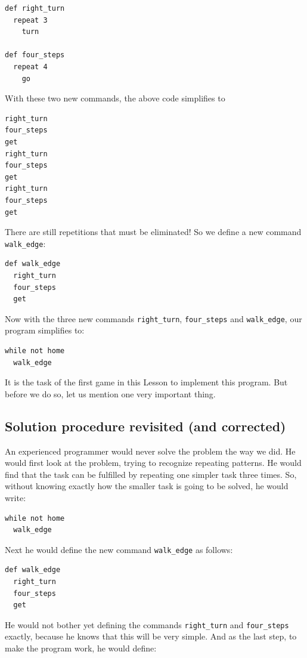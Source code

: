 \documentclass[article,A4,12pt]{llncs}
\begin{document}
{\small
\begin{verbatim}
def right_turn
  repeat 3
    turn

def four_steps
  repeat 4
    go
\end{verbatim}
}
\noindent
With these two new commands, the above code simplifies to 

{\small
\begin{verbatim}
right_turn
four_steps
get
right_turn
four_steps
get
right_turn
four_steps
get
\end{verbatim}
}
\noindent
There are still repetitions that must be eliminated! So we define a new command 
{\tt walk\_edge}:

{\small
\begin{verbatim}
def walk_edge
  right_turn
  four_steps
  get
\end{verbatim}
}
\noindent
Now with the three new commands {\tt right\_turn}, {\tt four\_steps} and
{\tt walk\_edge}, our program simplifies to:

{\small
\begin{verbatim}
while not home
  walk_edge
\end{verbatim}
}
\noindent
It is the task of the first game in this Lesson to implement this program. But before we 
do so, let us mention one very important thing.

\subsection{Solution procedure revisited (and corrected)}


An experienced programmer would never solve the problem the way we did.
He would first look at the problem, trying to recognize repeating patterns. 
He would find that the task can be fulfilled by repeating one simpler task 
three times. So, without knowing exactly how the smaller task is going to 
be solved, he would write:

{\small
\begin{verbatim}
while not home
  walk_edge
\end{verbatim}
}
\noindent
Next he would define the new command {\tt walk\_edge} as follows:

{\small
\begin{verbatim}
def walk_edge
  right_turn
  four_steps
  get
\end{verbatim}
}
\noindent
He would not bother yet defining the commands {\tt right\_turn} and 
{\tt four\_steps} exactly, because he knows that this will be very 
simple. And as the last step, to make the program work, he would 
define:
\end{document}
